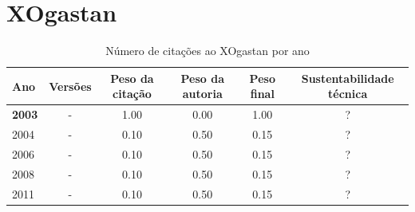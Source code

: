 \section{XOgastan}



\begin{table}[H]
\caption{Número de citações ao XOgastan por ano}
\centering
\begin{tabular}{| l | c | c | c | c | c |}
  \hline
  Ano & Versões & Peso da citação & Peso da autoria & Peso final & Sustentabilidade técnica \\
  \hline
            {\bf 2003}
          &
          -
          &
          1.00
          &
          0.00
          &
            {\color{blue} 1.00}
          &
          ?
          \\
\hline
            2004
          &
          -
          &
          0.10
          &
          0.50
          &
            {\color{red} 0.15}
          &
          ?
          \\
\hline
            2006
          &
          -
          &
          0.10
          &
          0.50
          &
            {\color{red} 0.15}
          &
          ?
          \\
\hline
            2008
          &
          -
          &
          0.10
          &
          0.50
          &
            {\color{red} 0.15}
          &
          ?
          \\
\hline
            2011
          &
          -
          &
          0.10
          &
          0.50
          &
            {\color{red} 0.15}
          &
          ?
          \\
\hline
\end{tabular}
\end{table}




